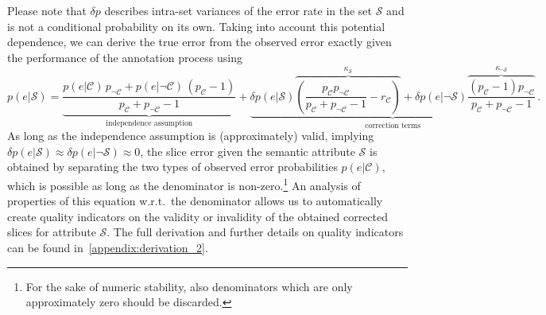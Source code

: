 Please note that $\delta p$ describes intra-set variances of the error rate in the set $\mathcal S$ and is not a conditional probability on its own.
Taking into account this potential dependence, we can derive the true error from the observed error exactly given the performance of the annotation process using
\begin{equation}\label{eq:correction_equation}
    p(e|\mathcal S) = \underbrace{\frac{p(e|\mathcal C)\,p_{\neg\mathcal C}+p(e|\neg\mathcal C)\,(p_\mathcal C-1)}{p_\mathcal C + p_{\neg\mathcal C}-1}}_\text{independence assumption}
    +\underbrace{\delta p(e|\mathcal S) \overbrace{\left(\frac{p_\mathcal C p_{\neg\mathcal C}}{p_\mathcal C + p_{\neg\mathcal C}-1}-r_\mathcal C\right)}^{\kappa_\mathcal S} 
    +\delta p(e|\neg\mathcal S)\overbrace{\frac{(p_\mathcal C -1)p_{\neg\mathcal C}}{p_\mathcal C + p_{\neg\mathcal C}-1}}^{\kappa_{\neg\mathcal S}}}_\text{correction terms}\,.
\end{equation}
As long as the independence assumption is (approximately) valid, implying $\delta p(e|\mathcal S)\approx \delta p(e|\neg\mathcal S)\approx 0$, the slice error given the semantic attribute $\mathcal S$ is obtained by separating the two types of observed error probabilities $p(e|\mathcal C)$, which is possible as long as the denominator is non-zero.\footnote{For the sake of numeric stability, also denominators which are only approximately zero should be discarded.}
An analysis of properties of this equation w.r.t.\ the denominator allows us to automatically create quality indicators on the validity or invalidity of the obtained corrected slices for attribute $\mathcal S$. The full derivation and further details on quality indicators can be found in~\cref{appendix:derivation_2}.


